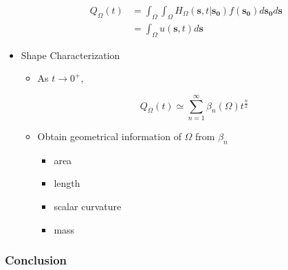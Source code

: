 \begin{itemize}
       \begin{align}
         Q_{\Omega}(t) &= \int_{\Omega} \int_{\Omega} H_{\Omega}(\bm{s}, t | \bm{s_0}) f(\bm{s_0})  d\bm{s_0} d\bm{s} \label{eq:heat_content_integral_full} \\
            &= \int_{\Omega} u(\bm{s}, t) d\bm{s} \label{eq:heat_content_integral_convol}
       \end{align}


     \item Shape Characterization

       \begin{itemize}
       \item As $t \rightarrow 0^{+}$,

         \begin{equation}\label{eq:heat_content_asy}
           Q_{\Omega}(t) \simeq \sum_{n=1}^{\infty} \beta_n(\Omega) t ^{\frac{n}{2}}
         \end{equation}
         
         
         \item Obtain geometrical information of $\Omega$ from $\beta_n$
           \begin{itemize}
           \item area
           \item length
           \item scalar curvature
           \item mass
         \end{itemize}
       \end{itemize}
       
       
   \end{itemize}



  \subsubsection{Conclusion}

